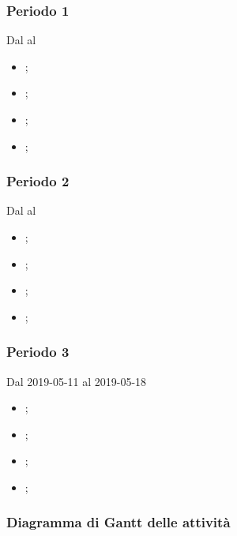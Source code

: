 \subsubsection{Periodo 1} 
Dal al
\begin{itemize}
	\item \textbf{};
	\item \textbf{};
	\item \textbf{};
	\item \textbf{};
\end{itemize}
\subsubsection{Periodo 2} 
Dal al
\begin{itemize}
	\item \textbf{};
	\item \textbf{};
	\item \textbf{};
	\item \textbf{};
\end{itemize}
\subsubsection{Periodo 3} 
Dal 2019-05-11 al 2019-05-18
\begin{itemize}
	\item \textbf{};
	\item \textbf{};
	\item \textbf{};
	\item \textbf{};
\end{itemize}
\subsubsection{Diagramma di Gantt delle attività}